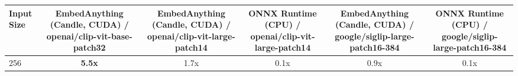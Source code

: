 \begin{tabular}{lccccc}
\toprule
\textbf{Input Size} & \textbf{EmbedAnything (Candle, CUDA) / openai/clip-vit-base-patch32} & \textbf{EmbedAnything (Candle, CUDA) / openai/clip-vit-large-patch14} & \textbf{ONNX Runtime (CPU) / openai/clip-vit-large-patch14} & \textbf{EmbedAnything (Candle, CUDA) / google/siglip-large-patch16-384} & \textbf{ONNX Runtime (CPU) / google/siglip-large-patch16-384} \\
\midrule
256 & \textbf{5.5x} & 1.7x & 0.1x & 0.9x & 0.1x \\
\bottomrule
\end{tabular}
